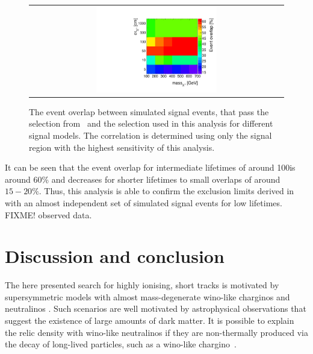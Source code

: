 \begin{figure}[!b]
\vspace{20pt}
  \centering 
  \begin{tabular}{c}
    \includegraphics[width=0.49\textwidth]{figures/analysis/Interpretation/AnalysisOverlap.pdf}  
  \end{tabular}
  \caption{The event overlap between simulated signal events, that pass the selection from~\cite{bib:CMS:DT_8TeV} and the selection used in this analysis for different signal models.
          The correlation is determined using only the signal region with the highest sensitivity of this analysis.}
  \label{fig:AnalysisOverlap}
\end{figure} 
It can be seen that the event overlap for intermediate lifetimes of around 100\cm is around 60\% and decreases for shorter lifetimes to small overlaps of around $15-20\%$.
Thus, this analysis is able to confirm the exclusion limits derived in~\cite{bib:CMS:DT_8TeV} with an almost independent set of simulated signal events for low lifetimes.
FIXME! observed data.



\FloatBarrier
\chapter{Discussion and conclusion}
\label{sec:Discussion}

The here presented search for highly ionising, short tracks is motivated by supersymmetric models with almost mass-degenerate wino-like charginos \chipm and neutralinos \chiO.
Such scenarios are well motivated by astrophysical observations that suggest the existence of large amounts of dark matter.
It is possible to explain the relic density with wino-like neutralinos if they are non-thermally produced via the decay of long-lived particles, such as a wino-like chargino~\cite{bib:Moroi:DarkMatter_2013}.\\

